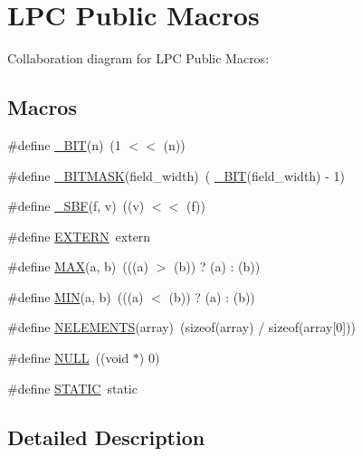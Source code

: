 \hypertarget{group__LPC__Types__Public__Macros}{}\section{L\+PC Public Macros}
\label{group__LPC__Types__Public__Macros}
Collaboration diagram for L\+PC Public Macros\+:
\subsection*{Macros}
\begin{DoxyCompactItemize}
\item 
\#define \hyperlink{group__LPC__Types__Public__Macros_ga7ee022f5e5a971a8324e4b7572d49170}{\+\_\+\+B\+IT}(n)~(1 $<$$<$ (n))
\item 
\#define \hyperlink{group__LPC__Types__Public__Macros_ga78ad3421dde54769e8b46d36819ae87a}{\+\_\+\+B\+I\+T\+M\+A\+SK}(field\+\_\+width)~( \hyperlink{group__LPC__Types__Public__Macros_ga7ee022f5e5a971a8324e4b7572d49170}{\+\_\+\+B\+IT}(field\+\_\+width) -\/ 1)
\item 
\#define \hyperlink{group__LPC__Types__Public__Macros_ga6caca3483c2ce446900be05ea02e8f49}{\+\_\+\+S\+BF}(f,  v)~((v) $<$$<$ (f))
\item 
\#define \hyperlink{group__LPC__Types__Public__Macros_ga77366c1bd428629dc898e188bfd182a3}{E\+X\+T\+E\+RN}~extern
\item 
\#define \hyperlink{group__LPC__Types__Public__Macros_gafa99ec4acc4ecb2dc3c2d05da15d0e3f}{M\+AX}(a,  b)~(((a) $>$ (b)) ? (a) \+: (b))
\item 
\#define \hyperlink{group__LPC__Types__Public__Macros_ga3acffbd305ee72dcd4593c0d8af64a4f}{M\+IN}(a,  b)~(((a) $<$ (b)) ? (a) \+: (b))
\item 
\#define \hyperlink{group__LPC__Types__Public__Macros_gafdd9296176e56fcfd83c07d345a045a7}{N\+E\+L\+E\+M\+E\+N\+TS}(array)~(sizeof(array) / sizeof(array\mbox{[}0\mbox{]}))
\item 
\#define \hyperlink{group__LPC__Types__Public__Macros_ga070d2ce7b6bb7e5c05602aa8c308d0c4}{N\+U\+LL}~((void $\ast$) 0)
\item 
\#define \hyperlink{group__LPC__Types__Public__Macros_ga10b2d890d871e1489bb02b7e70d9bdfb}{S\+T\+A\+T\+IC}~static
\end{DoxyCompactItemize}


\subsection{Detailed Description}


